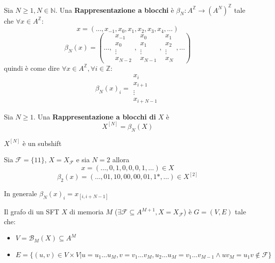 \begin{definizione} 
    Sia $N\ge 1, N\in\mathbb{N}$. Una \textbf{Rappresentazione a blocchi} è $\beta_N:A^\mathbb{Z}\to (A^N)^\mathbb{Z}$
    tale che $\forall x\in A^\mathbb{Z}$:
    $$x=(\dots, x_{-1},x_0,x_1,x_2,x_3,x_4,\dots)$$
    $$\beta_N(x)=\left(\dots, \begin{array}{c}x_{-1}\\x_0\\\vdots\\x_{N-2}\end{array},\begin{array}{c}x_{0}\\x_1\\\vdots\\x_{N-1}\end{array},\begin{array}{c}x_{1}\\x_2\\\vdots\\x_{N}\end{array},\dots\right)$$
    quindi è come dire $\forall x\in A^\mathbb{Z}, \forall i \in \mathbb{Z}$:
    $$\beta_N(x)_i = \begin{array}{c}x_{i}\\x_{i+1}\\\vdots\\x_{i+N-1}\end{array}$$
\end{definizione}

\begin{definizione} 
    Sia $N\ge 1$. Una \textbf{Rappresentazione a blocchi di} $X$ è
    $$X^{[N]} =\beta_N (X)$$
\end{definizione}

\begin{teorema}
    $X^{[N]} $ è un subshift
\end{teorema}

\begin{esempio}
    Sia $\mathcal{F}=\{11\}$, $X = X_\mathcal{F}$ e sia $N=2$ allora
    $$x=(\dots, 0,1,0,0,0,1,\dots)\in X$$
    $$\beta_2(x)=(\dots, 01,10,00,00,01,1\ast,\dots)\in X^{[2]}$$

    In generale $\beta_N(x)_i = x_{[i, i+N-1]}$
\end{esempio}

\begin{definizione} 
    Il grafo di un SFT $X$ di memoria $M$ ($\exists \mathcal{F}\subseteq A^{M+1}, X= X_\mathcal{F}$)
    è $G=(V,E)$ tale che:
    \begin{itemize}
        \item $V = \mathcal{B}_M(X)\subseteq A^M$
        \item $E = \{(u,v)\in V\times V | u = u_1\dots u_M, v= v_1\dots v_M,u_2\dots u_M = v_1\dots v_{M-1}\land uv_M= u_1v \not \in \mathcal{F}\}$
    \end{itemize}
\end{definizione}

